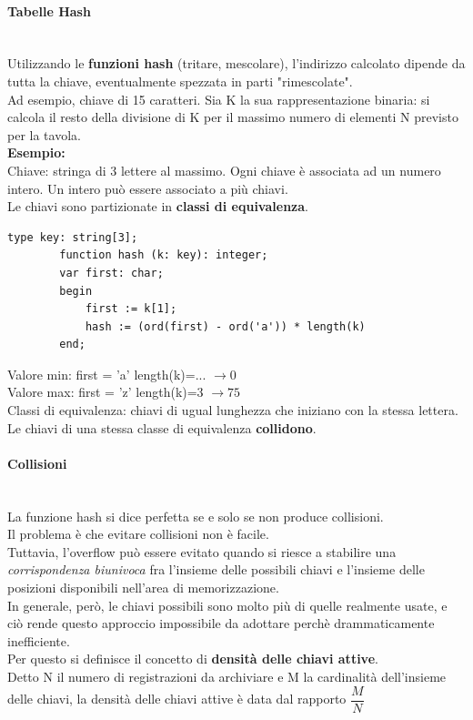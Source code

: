 \documentclass[12pt]{report}
\begin{document}
	\paragraph{Tabelle Hash} \quad \\
	Utilizzando le \textbf{funzioni hash} (tritare, mescolare), l'indirizzo calcolato dipende da tutta la chiave, eventualmente spezzata in parti "rimescolate". \\
	Ad esempio, chiave di 15 caratteri. Sia K la sua rappresentazione binaria: si calcola il resto della divisione di K per il massimo numero di elementi N previsto per la tavola. \\
	\textbf{Esempio:} \\
	Chiave: stringa di 3 lettere al massimo. Ogni chiave è associata ad un numero intero. Un intero può essere associato a più chiavi. \\
	Le chiavi sono partizionate in \textbf{classi di equivalenza}. \\
	\begin{lstlisting}[style=pascalstyle]
		type key: string[3];
		function hash (k: key): integer;
		var first: char;
		begin
			first := k[1];
			hash := (ord(first) - ord('a')) * length(k)
		end;
	\end{lstlisting}
	Valore min: \quad first = 'a' \quad length(k)=... $\to 0$ \\
	Valore max: \quad first = 'z' \quad length(k)=3 $\to 75$ \\
	Classi di equivalenza: chiavi di ugual lunghezza che iniziano con la stessa lettera. \\
	Le chiavi di una stessa classe di equivalenza \textbf{collidono}. \\
	\paragraph{Collisioni} \quad \\
	La funzione hash si dice perfetta se e solo se non produce collisioni. \\
	Il problema è che evitare collisioni non è facile. \\
	Tuttavia, l'overflow può essere evitato quando si riesce a stabilire una \textit{corrispondenza biunivoca} fra l'insieme delle possibili chiavi e l'insieme delle posizioni disponibili nell'area di memorizzazione. \\
	In generale, però, le chiavi possibili sono molto più di quelle realmente usate, e ciò rende questo approccio impossibile da adottare perchè drammaticamente inefficiente. \\
	Per questo si definisce il concetto di \textbf{densità delle chiavi attive}. \\
	Detto N il numero di registrazioni da archiviare e M la cardinalità dell'insieme delle chiavi, la densità delle chiavi attive è data dal rapporto $\dfrac{M}{N}$ \\
\end{document}
